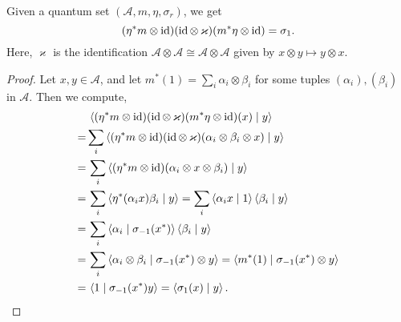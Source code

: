  \begin{proposition}\label{modAut_one_eq_left_twist}
  \leanok
  Given a quantum set $(\mathcal{A},m,\eta,\sigma_r)$, we get
  \[(\eta^*m\otimes\operatorname{id})(\operatorname{id}\otimes\,\varkappa)(m^*\eta\otimes\operatorname{id})=\sigma_1.\]
  Here, $\varkappa$ is the identification $\mathcal{A}\otimes\mathcal{A}\cong\mathcal{A}\otimes\mathcal{A}$ given by $x\otimes y\mapsto y\otimes x$.
 \end{proposition}
 \begin{proof}\leanok
  Let $x,y\in\mathcal{A}$, and let $m^*(1)=\sum_i\alpha_i\otimes\beta_i$ for some tuples $(\alpha_i),(\beta_i)$ in $\mathcal{A}$.
  Then we compute,
  \begin{align*}
   &\,\left\langle(\eta^*m\otimes\operatorname{id})(\operatorname{id}\otimes\,\varkappa)(m^*\eta\otimes\operatorname{id})(x) \mid y\right\rangle\\
   =& \sum_i\left\langle(\eta^*m\otimes\operatorname{id})(\operatorname{id}\otimes\,\varkappa)(\alpha_i\otimes\beta_i\otimes x) \mid y\right\rangle\\
   =&\, \sum_i\left\langle(\eta^*m\otimes\operatorname{id})(\alpha_i\otimes x\otimes \beta_i) \mid y\right\rangle\\
   =&\, \sum_i\left\langle\eta^*(\alpha_ix)\beta_i \mid y\right\rangle
   = \sum_i\left\langle\alpha_ix \mid 1\right\rangle\left\langle\beta_i \mid y\right\rangle\\
   =&\, \sum_i\left\langle\alpha_i \mid \sigma_{-1}(x^*)\right\rangle\left\langle\beta_i \mid y\right\rangle\\
   =&\, \sum_i\left\langle\alpha_i\otimes\beta_i \mid \sigma_{-1}(x^*)\otimes y\right\rangle=\left\langle m^*(1) \mid \sigma_{-1}(x^*)\otimes y\right\rangle\\
   =&\, \left\langle1 \mid \sigma_{-1}(x^*)y\right\rangle=\left\langle\sigma_{1}(x) \mid y\right\rangle.
  \end{align*}
 \end{proof}


